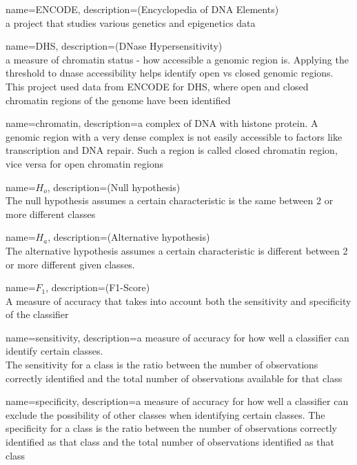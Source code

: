 {
        name=ENCODE,
        description={(Encyclopedia of DNA Elements) \\ a project that studies various genetics and epigenetics data}
}

{
        name=DHS,
        description={(DNase Hypersensitivity) \\ a measure of chromatin status - how accessible a genomic region is. Applying the threshold to dnase accessibility helps identify open vs closed genomic regions. This project used data from ENCODE for DHS, where open and closed chromatin regions of the genome have been identified}
}

{
        name=chromatin,
        description={a complex of DNA with histone protein. A genomic region with a very dense complex is not easily accessible to factors like transcription and DNA repair. Such a region is called closed chromatin region, vice versa for open chromatin regions}
}

{
        name=$H_o$,
        description={(Null hypothesis) \\ The null hypothesis assumes a certain characteristic is the same between 2 or more different classes}
}

{
        name=$H_a$,
        description={(Alternative hypothesis) \\ The alternative hypothesis assumes a certain characteristic is different between 2 or more different given classes.}
}

{
        name=$F_1$,
        description={(F1-Score) \\ A measure of accuracy that takes into account both the sensitivity and specificity of the classifier}
}

{
        name=sensitivity,
        description={a measure of accuracy for how well a classifier can identify certain classes. \\The sensitivity for a class is the ratio between the number of observations correctly identified and the total number of observations available for that class}
}

{
        name=specificity,
        description={a measure of accuracy for how well a classifier can exclude the possibility of other classes when identifying certain classes. The specificity for a class is the ratio between the number of observations correctly identified as that class and the total number of observations identified as that class}
}

